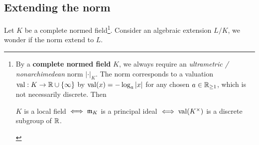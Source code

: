 
    

\subsection{Extending the norm}
Let $K$ be a complete normed field\footnote{By a \textbf{complete normed field} $K$,
we always require an \textit{ultrametric / nonarchimedean} norm $|\cdot|_K$. The norm corresponds to a valuation $\operatorname{val} : K\to\mathbb{R}\cup\{\infty\}$ by $\operatorname{val}(x) = -\log_a|x|$ for any chosen $a\in \mathbb{R}_{\ge 1}$, which is not necessarily discrete.
Then \begin{center}
    $K$ is a local field $\iff \mathfrak{m}_K$ is a principal ideal $\iff \operatorname{val}(K^\times)$ is a discrete subgroup of $\mathbb{R}$.
\end{center}
}.
Consider an algebraic extension $L/K$, we wonder if the norm extend to $L$.

